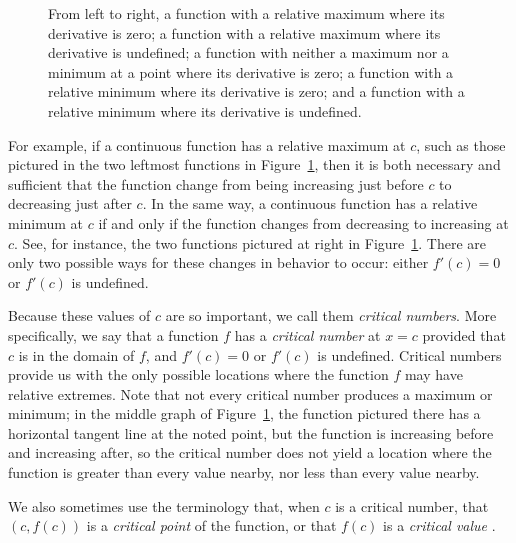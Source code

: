 \begin{figure}[h]
\begin{center}
\caption{From left to right, a function with a relative maximum where its derivative is zero; a function with a relative maximum where its derivative is undefined; a function with neither a maximum nor a minimum at a point where its derivative is zero; a function with a relative minimum where its derivative is zero; and a function with a relative minimum where its derivative is undefined.} \label{F:3.1.extremes}
\end{center}
\end{figure}

For example, if a continuous function has a relative maximum at $c$, such as those pictured in the two leftmost functions in Figure~\ref{F:3.1.extremes}, then it is both necessary and sufficient that the function change from being increasing just before $c$ to decreasing just after $c$.  In the same way, a continuous function has a relative minimum at $c$ if and only if the function changes from decreasing to increasing at $c$.  See, for instance, the two functions pictured at right in Figure~\ref{F:3.1.extremes}.  There are only two possible ways for these changes in behavior to occur:  either $f'(c) = 0$ or $f'(c)$ is undefined.  

Because these values of $c$ are so important, we call them \emph{critical numbers}.  More specifically, we say that a function $f$ has a \emph{critical number}  at  $x = c$ provided that $c$ is in the domain of $f$, and $f'(c) = 0$ or $f'(c)$ is undefined.   Critical numbers provide us with the only possible locations where the function $f$ may have relative extremes.  Note that not every critical number produces a maximum or minimum; in the middle graph of Figure~\ref{F:3.1.extremes}, the function pictured there has a horizontal tangent line at the noted point, but the function is increasing before and increasing after, so the critical number does not yield a location where the function is greater than every value nearby, nor less than every value nearby.

We also sometimes use the terminology that, when $c$ is a critical number, that $(c,f(c))$ is a \emph{critical point}  of the function, or that $f(c)$ is a \emph{critical value} .

